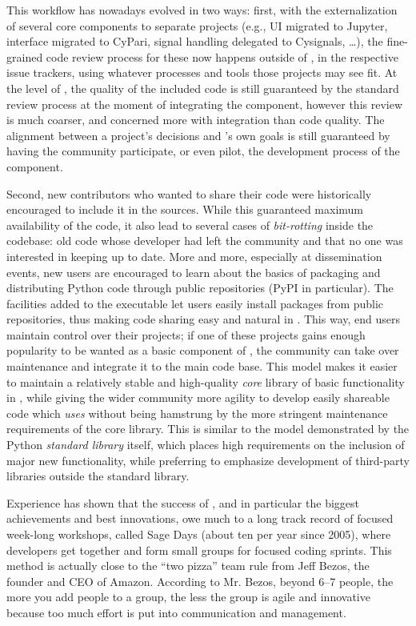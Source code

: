 \documentclass{deliverablereport}
\begin{document}
This workflow has nowadays evolved in two ways: first, with the
externalization of several core components to separate projects (e.g.,
UI migrated to Jupyter, \PariGP interface migrated to CyPari, signal
handling delegated to Cysignals, \dots), the fine-grained code review
process for these now happens outside of \Sage, in the respective
issue trackers, using whatever processes and tools those projects may see
fit. %
At the level of \Sage, the quality of the included code is still
guaranteed by the standard review process at the moment of integrating
the component, however this review is much coarser, and concerned more
with integration than code quality. %
The alignment between a project's decisions and \Sage's own goals is
still guaranteed by having the \Sage community participate, or even
pilot, the development process of the component.

Second, new \Sage contributors who wanted to share their code were
historically encouraged to include it in the \Sage sources. %
While this guaranteed maximum availability of the code, it also lead
to several cases of \emph{bit-rotting} inside the \Sage codebase: old
code whose developer had left the community and that no one was
interested in keeping up to date. %
More and more, especially at \ODK dissemination events, new users are
encouraged to learn about the basics of packaging and distributing
Python code through public repositories (PyPI in particular). %
The facilities added to the \Sage executable let users easily install
packages from public repositories, thus making code sharing easy and
natural in \Sage. %
This way, end users maintain control over their \Sage projects; if one
of these projects gains enough popularity to be wanted as a basic
component of \Sage, the community can take over maintenance and
integrate it to the main code base.  This model makes it easier to
maintain a relatively stable and high-quality \emph{core} library of
basic functionality in \Sage, while giving the wider community more
agility to develop easily shareable code which \emph{uses} \Sage
without being hamstrung by the more stringent maintenance requirements
of the core library.  This is similar to the model demonstrated by the
Python \emph{standard library} itself, which places high requirements
on the inclusion of major new functionality, while preferring to
emphasize development of third-party libraries outside the standard
library. %

Experience has shown that the success of \Sage, and in particular the
biggest achievements and best innovations, owe much to a long track record of
focused week-long workshops, called Sage Days (about ten per year
since 2005), where developers get together and form small groups for
focused coding sprints. This method is actually close to the ``two pizza''
team rule from Jeff Bezos, the founder and CEO of Amazon. According
to Mr. Bezos, beyond 6--7 people, the more you add people to a group,
the less the group is agile and innovative because too much effort is
put into communication and management.  %
\end{document}
